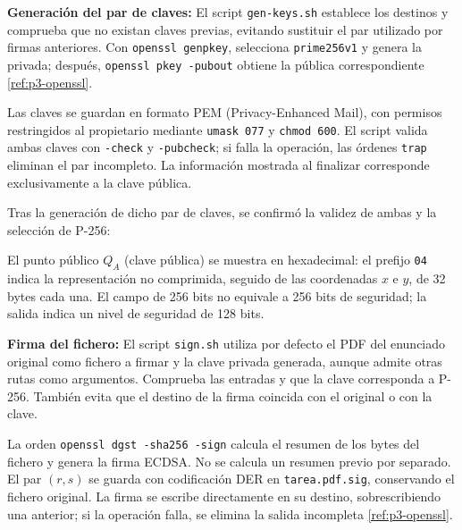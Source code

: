 \textbf{Generación del par de claves:} El script \texttt{gen-keys.sh} establece los destinos y comprueba que no existan claves previas, evitando sustituir el par utilizado por firmas anteriores. Con \texttt{openssl genpkey}, selecciona \texttt{prime256v1} y genera la privada; después, \texttt{openssl pkey -pubout} obtiene la pública correspondiente \ref{ref:p3-openssl}.

Las claves se guardan en formato PEM (Privacy-Enhanced Mail), con permisos restringidos al propietario mediante \texttt{umask 077} y \texttt{chmod 600}. El script valida ambas claves con \texttt{-check} y \texttt{-pubcheck}; si falla la operación, las órdenes \texttt{trap} eliminan el par incompleto. La información mostrada al finalizar corresponde exclusivamente a la clave pública.

\begingroup
\renewcommand{\lstlistingname}{Script}

\endgroup

Tras la generación de dicho par de claves, se confirmó la validez de ambas y la selección de P-256:

\noindent\begin{minipage}{\linewidth}
\begingroup
\renewcommand{\lstlistingname}{Salida y verificación}

\endgroup
\end{minipage}

El punto público $Q_A$ (clave pública) se muestra en hexadecimal: el prefijo \texttt{04} indica la representación no comprimida, seguido de las coordenadas $x$ e $y$, de 32 bytes cada una. El campo de 256 bits no equivale a 256 bits de seguridad; la salida indica un nivel de seguridad de 128 bits.

\textbf{Firma del fichero:} El script \texttt{sign.sh} utiliza por defecto el PDF del enunciado original como fichero a firmar y la clave privada generada, aunque admite otras rutas como argumentos. Comprueba las entradas y que la clave corresponda a P-256. También evita que el destino de la firma coincida con el original o con la clave.

La orden \texttt{openssl dgst -sha256 -sign} calcula el resumen de los bytes del fichero y genera la firma ECDSA. No se calcula un resumen previo por separado. El par $(r,s)$ se guarda con codificación DER en \texttt{tarea.pdf.sig}, conservando el fichero original.
La firma se escribe directamente en su destino, sobrescribiendo una anterior; si la operación falla, se elimina la salida incompleta \ref{ref:p3-openssl}.

